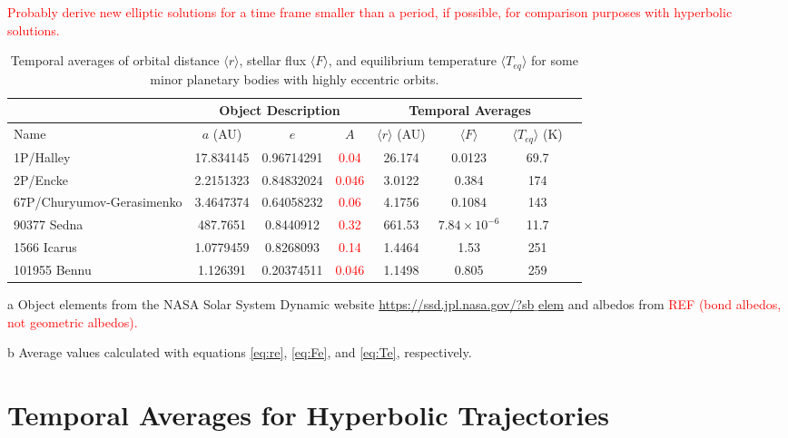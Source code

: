 \documentclass[a4paper,fleqn,usenatbib]{mnras}
\newcommand{\fix}{\textcolor{red}}
\begin{document}
\fix{Probably derive new elliptic solutions for a time frame smaller than a period, if possible, for comparison purposes with hyperbolic solutions.}

\begin{table*}
\begin{threeparttable}
\centering
\caption{Temporal averages of orbital distance $\langle r \rangle$, stellar flux $\langle F \rangle$, and equilibrium temperature $\langle T_{eq} \rangle$ for some minor planetary bodies with highly eccentric orbits.}
\begin{tabular}{ l c c c c | c c c }
 \hline
 \hline
 & \multicolumn{3}{c}{Object Description\tnote{a}} & \multicolumn{3}{c}{Temporal Averages\tnote{b}} \\
 \hline
 Name & $a$ (AU) & $e$ & $A$ &
 	$\langle r \rangle$ (AU) & $\langle F \rangle$ & $\langle T_{eq} \rangle$ (K) \\ 
 \hline
 1P/Halley & 17.834145 & 0.96714291 & \fix{0.04} & 26.174  & 0.0123 & 69.7 \\  
 2P/Encke & 2.2151323 & 0.84832024 & \fix{0.046} & 3.0122  & 0.384 & 174 \\
 67P/Churyumov-Gerasimenko & 3.4647374 & 0.64058232 & \fix{0.06} & 4.1756  & 0.1084 & 143 \\
 90377 Sedna & 487.7651 & 0.8440912 & \fix{0.32}  & 661.53  & $7.84\times10^{-6}$ & 11.7 \\
 1566 Icarus & 1.0779459 & 0.8268093 & \fix{0.14}  & 1.4464  & 1.53 & 251 \\
 101955	Bennu & 1.126391 & 0.20374511 & \fix{0.046}   & 1.1498 & 0.805 & 259 \\
 \hline
 \hline
\end{tabular}
\label{tab:elliptic}
	\begin{tablenotes}
	\small
\item[a]{Object elements from the NASA Solar System Dynamic website \href{https://ssd.jpl.nasa.gov/?sb$\_$elem}{https://ssd.jpl.nasa.gov/?sb$\_$elem} and albedos from \fix{REF (bond albedos, not geometric albedos).}}
\item[b]{Average values calculated with equations \ref{eq:re}, \ref{eq:Fe}, and \ref{eq:Te}, respectively.}
	\end{tablenotes}
\end{threeparttable}
\end{table*}


\section{Temporal Averages for Hyperbolic Trajectories} \label{sec:hyperbolic}
\end{document}
